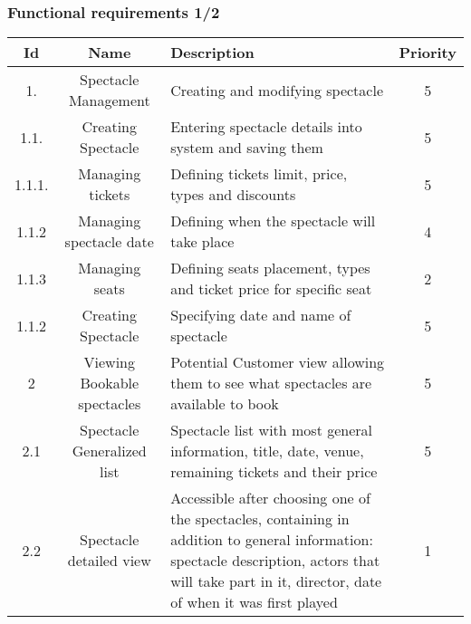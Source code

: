 \documentclass[12pt]{article}
\begin{document}
\subsubsection{Functional requirements 1/2}
\begin{tabular}{| c | c | p{5cm} | c | }
    \hline 
  Id & Name & Description & Priority \\ \hline
  1. & Spectacle Management & Creating and modifying spectacle  & 5 \\ \hline
  1.1. & Creating Spectacle & Entering spectacle details into system and saving them & 5 \\ \hline 
  1.1.1. & Managing tickets & Defining tickets limit, price, types and discounts  & 5 \\ \hline 
  1.1.2 & Managing spectacle date & Defining when the spectacle will take place & 4 \\ \hline  
  1.1.3 & Managing seats & Defining seats placement, types and ticket price for specific seat & 2 \\ \hline 
  1.1.2 & Creating Spectacle & Specifying date and name of spectacle & 5 \\ \hline 
  2 & Viewing Bookable spectacles & Potential Customer view allowing them to see what spectacles are available to book & 5 \\ \hline 
  2.1 & Spectacle Generalized list & Spectacle list with most general information, title, date, venue, remaining tickets and their price & 5 \\ \hline 
  2.2 & Spectacle detailed view & Accessible after choosing one of the spectacles, containing in addition to general information: spectacle description, actors that will take part in it, director, date of when it was first played & 1 \\ \hline 
\end{tabular}
\end{document}
